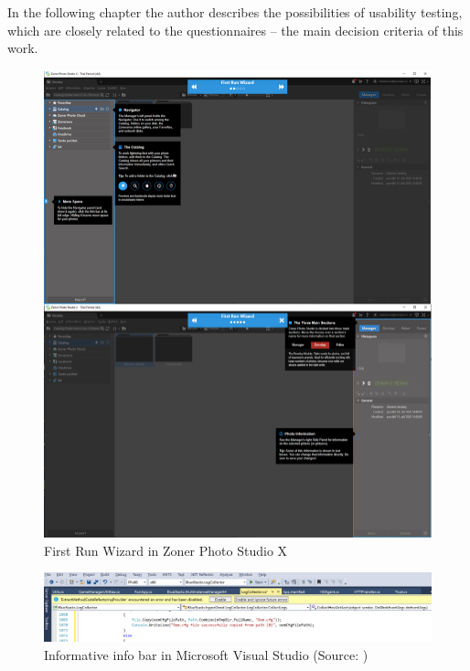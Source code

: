 \documentclass[a4paper,10pt,twoside]{article}
\begin{document}
In the following chapter the author describes the possibilities of usability testing, which are closely related to the questionnaires -- the main decision criteria of this work.

\vspace{0.3cm}
\begin{figure}[hbt!] 
\begin{center}
\includegraphics[width=17cm]{../pictures/zoner.png} 
\caption[First Run Wizard in Zoner Photo Studio X]{First Run Wizard in Zoner Photo Studio X}
\label{fig:zoner}
\end{center}
\end{figure}

\vspace{0.3cm}
\begin{figure}[hbt!] 
\begin{center}
\includegraphics[width=17cm]{../pictures/info_infobar.png} 
\caption[Informative info bar in Microsoft Visual Studio]{Informative info bar in Microsoft Visual Studio (Source: \cite{visualstudio})}
\label{fig:info_infobar}
\end{center}
\end{figure}
\end{document}

